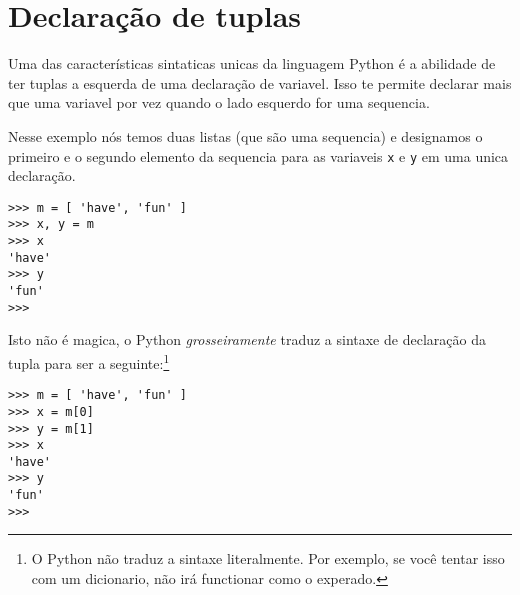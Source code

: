 \section{Declaração de tuplas}
\label{tuple assignment}


Uma das características sintaticas unicas da linguagem Python é
a abilidade de ter tuplas a esquerda de uma declaração de variavel.
Isso te permite declarar mais que uma variavel por vez quando o
lado esquerdo for uma sequencia.

Nesse exemplo nós temos duas listas (que são uma sequencia) e
designamos o primeiro e o segundo elemento da sequencia para as
variaveis {\tt x} e {\tt y} em uma unica declaração.

\beforeverb
\begin{verbatim}
>>> m = [ 'have', 'fun' ]
>>> x, y = m
>>> x
'have'
>>> y
'fun'
>>> 
\end{verbatim}
\afterverb
%
Isto não é magica, o Python \emph{grosseiramente} traduz a
sintaxe de declaração da tupla
para ser a seguinte:\footnote{O Python não traduz a sintaxe
literalmente. Por exemplo, se você tentar isso com um dicionario, não
irá functionar como o experado.}

\beforeverb
\begin{verbatim}
>>> m = [ 'have', 'fun' ]
>>> x = m[0]
>>> y = m[1]
>>> x
'have'
>>> y
'fun'
>>> 
\end{verbatim}
\afterverb

